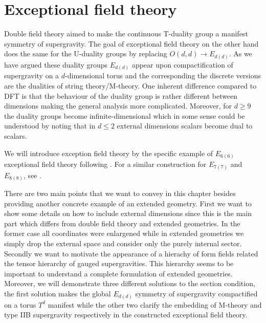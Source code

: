 \chapter{Exceptional field theory\label{chap:ExceptionalFieldTheory}}

Double field theory aimed to make the continuous T-duality group a manifest symmetry of supergravity. The goal of exceptional field theory on the other hand does the same for the U-duality groups by replacing $O(d,d)\to E_{d(d)}$. As we have argued these duality groups $E_{d(d)}$ appear upon compactification of supergravity on a $d$-dimensional torus and the corresponding the discrete versions are the dualities of string theory/M-theory. One inherent difference compared to DFT is that the behaviour of the duality group is rather different between dimensions making the general analysis more complicated. Moreover, for $d\geq 9$ the duality groups become infinite-dimensional which in some sense could be understood by noting that in $d\leq 2$ external dimensions scalars become dual to scalars. %

We will introduce exception field theory by the specific example of $E_{6(6)}$ exceptional field theory following \cite{E62014}. For a similar construction for $E_{7(7)}$ and $E_{8(8)}$, see \cite{E72014,E82014}. 

There are two main points that we want to convey in this chapter besides providing another concrete example of an extended geometry. First we want to show some details on how to include external dimensions since this is the main part which differs from double field theory and extended geometries. In the former case all coordinates were enlargened while in extended geometries we simply drop the external space and consider only the purely internal sector. Secondly we want to motivate the appearance of a hierachy of form fields related the tensor hierarchy of gauged supergravities. This hierarchy seems to be important to understand a complete formulation of extended geometries. Moreover, we will demonstrate three different solutions to the section condition, the first solution makes the global $E_{d(d)}$ symmetry of supergravity compactified on a torus $T^d$ manifest while the other two clarify the embedding of M-theory and type IIB supergravity respectively in the constructed exceptional field theory. 

